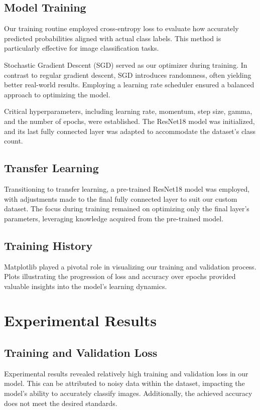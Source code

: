 \documentclass{article}
\begin{document}
\subsection{Model Training}

Our training routine employed cross-entropy loss to evaluate how accurately predicted probabilities aligned with actual class labels. This method is particularly effective for image classification tasks.

Stochastic Gradient Descent (SGD) served as our optimizer during training. In contrast to regular gradient descent, SGD introduces randomness, often yielding better real-world results. Employing a learning rate scheduler ensured a balanced approach to optimizing the model.

Critical hyperparameters, including learning rate, momentum, step size, gamma, and the number of epochs, were established. The ResNet18 model was initialized, and its last fully connected layer was adapted to accommodate the dataset's class count.

\subsection{Transfer Learning}

Transitioning to transfer learning, a pre-trained ResNet18 model was employed, with adjustments made to the final fully connected layer to suit our custom dataset. The focus during training remained on optimizing only the final layer's parameters, leveraging knowledge acquired from the pre-trained model.

\subsection{Training History}

Matplotlib played a pivotal role in visualizing our training and validation process. Plots illustrating the progression of loss and accuracy over epochs provided valuable insights into the model's learning dynamics.

\section{Experimental Results}
\subsection{Training and Validation Loss}

Experimental results revealed relatively high training and validation loss in our model. This can be attributed to noisy data within the dataset, impacting the model's ability to accurately classify images. Additionally, the achieved accuracy does not meet the desired standards.
\end{document}
